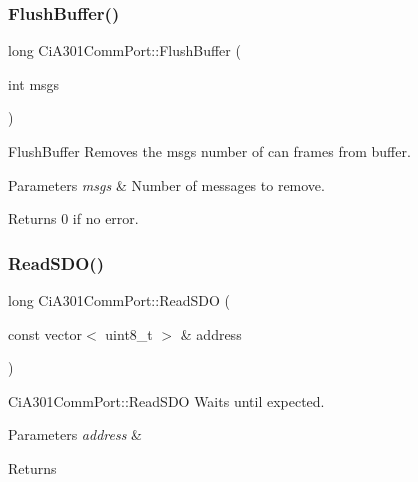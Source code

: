 \subsubsection{\texorpdfstring{Flush\+Buffer()}{FlushBuffer()}}
{\footnotesize\ttfamily long Ci\+A301\+Comm\+Port\+::\+Flush\+Buffer (\begin{DoxyParamCaption}\item[{int}]{msgs }\end{DoxyParamCaption})}



Flush\+Buffer Removes the msgs number of can frames from buffer. 


\begin{DoxyParams}{Parameters}
{\em msgs} & Number of messages to remove. \\
\hline
\end{DoxyParams}
\begin{DoxyReturn}{Returns}
0 if no error. 
\end{DoxyReturn}
\mbox{\label{classCiA301CommPort_a3f74ce5899b30731322dabd352ccdc55}} 
\subsubsection{\texorpdfstring{Read\+S\+D\+O()}{ReadSDO()}}
{\footnotesize\ttfamily long Ci\+A301\+Comm\+Port\+::\+Read\+S\+DO (\begin{DoxyParamCaption}\item[{const vector$<$ uint8\+\_\+t $>$ \&}]{address }\end{DoxyParamCaption})}



Ci\+A301\+Comm\+Port\+::\+Read\+S\+DO Waits until expected. 


\begin{DoxyParams}{Parameters}
{\em address} & \\
\hline
\end{DoxyParams}
\begin{DoxyReturn}{Returns}

\end{DoxyReturn}
\mbox{\label{classCiA301CommPort_a09feb3f78831c9fbb683a85cc3bc4562}} 
